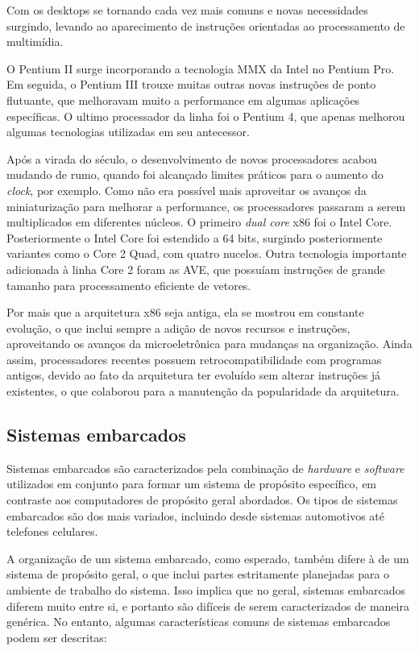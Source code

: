 \documentclass{article}
\begin{document}
Com os desktops se tornando cada vez mais comuns e novas necessidades surgindo,
levando ao aparecimento de instruções orientadas ao processamento de multimídia.

O Pentium II surge incorporando a tecnologia MMX da Intel no Pentium Pro. Em
seguida, o Pentium III trouxe muitas outras novas instruções de ponto flutuante,
que melhoravam muito a performance em algumas aplicações específicas. O ultimo
processador da linha foi o Pentium 4, que apenas melhorou algumas tecnologias
utilizadas em seu antecessor.

Após a virada do século, o desenvolvimento de novos processadores acabou mudando
de rumo, quando foi alcançado limites práticos para o aumento do \textit{clock},
por exemplo. Como não era possível mais aproveitar os avanços da miniaturização
para melhorar a performance, os processadores passaram a serem multiplicados em
diferentes núcleos. O primeiro \textit{dual core} x86 foi o Intel Core.
Posteriormente o Intel Core foi estendido a 64 bits, surgindo posteriormente
variantes como o Core 2 Quad, com quatro nucelos. Outra tecnologia importante
adicionada à linha Core 2 foram as AVE, que possuíam instruções de grande
tamanho para processamento eficiente de vetores.

Por mais que a arquitetura x86 seja antiga, ela se mostrou em constante
evolução, o que inclui sempre a adição de novos recursos e instruções,
aproveitando os avanços da microeletrônica para mudanças na organização. Ainda
assim, processadores recentes possuem retrocompatibilidade com programas
antigos, devido ao fato da arquitetura ter evoluído sem alterar instruções já
existentes, o que colaborou para a manutenção da popularidade da arquitetura.

\subsection{Sistemas embarcados}
Sistemas embarcados são caracterizados pela combinação de \textit{hardware} e
\textit{software} utilizados em conjunto para formar um sistema de propósito
específico, em contraste aos computadores de propósito geral abordados. Os tipos
de sistemas embarcados são dos mais variados, incluindo desde sistemas
automotivos até telefones celulares.

A organização de um sistema embarcado, como esperado, também difere à de um
sistema de propósito geral, o que inclui partes estritamente planejadas para o
ambiente de trabalho do sistema. Isso implica que no geral, sistemas embarcados
diferem muito entre si, e portanto são difíceis de serem caracterizados de
maneira genérica. No entanto, algumas características comuns de sistemas
embarcados podem ser descritas:
\end{document}
